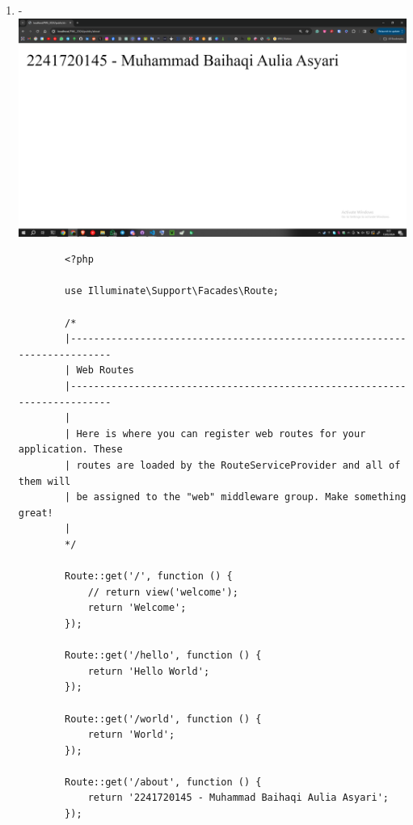 \documentclass[12pt,titlepage]{article}
\begin{document}
\begin{enumerate}[label=\alph*.]
\begin{verbatim}
        Route::get('/', function () {
            // return view('welcome');
            return 'Welcome';
        });
        
        Route::get('/hello', function () {
            return 'Hello World';
        });
        
        Route::get('/world', function () {
            return 'World';
        });
    \end{verbatim}
    \item - \\ \includegraphics[width=.9\textwidth]{images/figures/basic routing g.png}
    \begin{verbatim}
        <?php

        use Illuminate\Support\Facades\Route;
        
        /*
        |--------------------------------------------------------------------------
        | Web Routes
        |--------------------------------------------------------------------------
        |
        | Here is where you can register web routes for your application. These
        | routes are loaded by the RouteServiceProvider and all of them will
        | be assigned to the "web" middleware group. Make something great!
        |
        */
        
        Route::get('/', function () {
            // return view('welcome');
            return 'Welcome';
        });
        
        Route::get('/hello', function () {
            return 'Hello World';
        });
        
        Route::get('/world', function () {
            return 'World';
        }); 
        
        Route::get('/about', function () {
            return '2241720145 - Muhammad Baihaqi Aulia Asyari';
        });
    \end{verbatim}
\end{enumerate}
\end{document}

